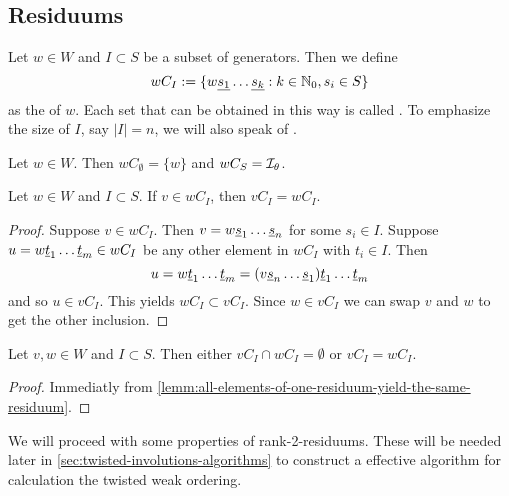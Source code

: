 \subsection{Residuums}
\label{sec:twisted-involutions-residuums}

\begin{defi}
	Let $w \in W$ and $I \subset S$ be a subset of generators. Then we define
	$$ wC_I := \{ w \underline{s_1} \ldots \underline{s_k} : k \in \mathbb{N}_0, s_i \in S \} $$
	as the  of $w$. Each set that can be obtained in this way is called . To emphasize the size of $I$, say $|I| = n$, we will also speak of .
\end{defi}

\begin{exam}
	Let $w \in W$. Then $wC_\emptyset = \{ w \}$ and $wC_S = \mathcal{I}_{\theta}$.
\end{exam}

\begin{lemm}
	Let $w \in W$ and $I \subset S$. If $v \in wC_I$, then $vC_I = wC_I$.

	\begin{proof}
		Suppose $v \in wC_I$. Then $v = w \underline{s}_1 \ldots \underline{s}_n$ for some $s_i \in I$. Suppose $u = w \underline{t}_1 \ldots \underline{t}_m \in wC_I$ be any other element in $wC_I$ with $t_i \in I$. Then
		$$ u = w \underline{t}_1 \ldots \underline{t}_m = (v \underline{s}_n \ldots \underline{s}_1) \underline{t}_1 \ldots \underline{t}_m $$
		and so $u \in vC_I$. This yields $wC_I \subset vC_I$. Since $w \in vC_I$ we can swap $v$ and $w$ to get the other inclusion.
	\end{proof}
\end{lemm}

\begin{coro}
	Let $v, w \in W$ and $I \subset S$. Then either $vC_I \cap wC_I = \emptyset$ or $vC_I = wC_I$.

	\begin{proof}
		Immediatly from \ref{lemm:all-elements-of-one-residuum-yield-the-same-residuum}.
	\end{proof}
\end{coro}

We will proceed with some properties of rank-2-residuums. These will be needed later in \ref{sec:twisted-involutions-algorithms} to construct a effective algorithm for calculation the twisted weak ordering.

